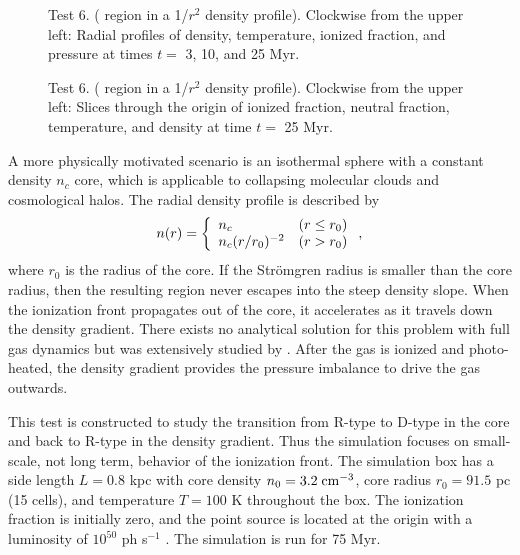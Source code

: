 \documentclass[12pt,preprint]{aastex}
\begin{document}
\begin{figure}[t]
  \caption{\label{fig:test6_2} Test 6. ( region in a 1/$r^2$
    density profile).  Clockwise from the upper left: Radial profiles of
    density, temperature, ionized fraction, and pressure at times $t
    =$ 3, 10, and 25 Myr.}
\end{figure}

\begin{figure}[t]
  \caption{\label{fig:test6_3} Test 6. ( region in a 1/$r^2$
    density profile).  Clockwise from the upper left: Slices through the origin
    of ionized fraction, neutral fraction, temperature, and density at
    time $t =$ 25 Myr.}
\end{figure}

A more physically motivated scenario is an isothermal sphere with a
constant density $n_c$ core, which is applicable to collapsing
molecular clouds and cosmological halos.  The radial density profile
is described by
%
\begin{equation}
  \label{eqn:test6_rho}
  n(r) = \left\{ \begin{array}{l@{\quad}l}
      n_c & (r \le r_0)\\
      n_c (r/r_0)^{-2} & (r > r_0)
    \end{array} \right. ,
\end{equation}
where $r_0$ is the radius of the core.  If the Str\"{o}mgren radius is
smaller than the core radius, then the resulting  region
never escapes into the steep density slope.  When the ionization front
propagates out of the core, it accelerates as it travels down the
density gradient.  There exists no analytical solution for this
problem with full gas dynamics but was extensively studied by
\citet{Franco90}.  After the gas is ionized and photo-heated, the
density gradient provides the pressure imbalance to drive the gas
outwards.

This test is constructed to study the transition from R-type to D-type
in the core and back to R-type in the density gradient.  Thus the
simulation focuses on small-scale, not long term, behavior of the
ionization front.  The simulation box has a side length $L = 0.8$ kpc
with core density $n_0 = 3.2\;\cubecm$, core radius $r_0 = 91.5$ pc
(15 cells), and temperature $T = 100$ K throughout the box.  The
ionization fraction is initially zero, and the point source is located
at the origin with a luminosity of $10^{50}$ ph s$^{-1}$ \cubecm.  The
simulation is run for 75 Myr.
\end{document}
